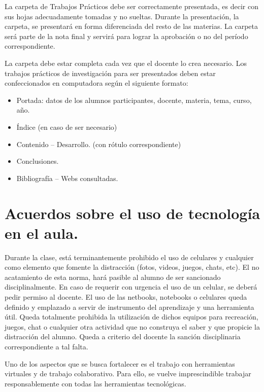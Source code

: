 \documentclass[../main]{subfiles}
\begin{document}
La carpeta de Trabajos Prácticos debe ser correctamente presentada, es decir con sus hojas adecuadamente tomadas y no sueltas. Durante la presentación, la carpeta, se presentará en forma diferenciada del resto de las materias. La carpeta será parte de la nota final y servirá para lograr la aprobación o no del período correspondiente. 

La carpeta debe estar completa cada vez que el docente lo crea necesario. Los trabajos prácticos de investigación para ser presentados deben estar confeccionados en computadora según el siguiente formato: 
\begin{itemize}
    
\item Portada: datos de los alumnos participantes, docente, materia, tema, curso, año. 

\item Índice (en caso de ser necesario) 

\item Contenido – Desarrollo. (con rótulo correspondiente) 

\item Conclusiones. 

\item Bibliografía – Webs consultadas. 

\end{itemize}
 

\section{Acuerdos sobre el uso de tecnología en el aula. } 

Durante la clase, está terminantemente prohibido el uso de celulares y cualquier como elemento que fomente la distracción (fotos, videos, juegos, chats, etc). El no acatamiento de esta norma, hará pasible al alumno de ser sancionado disciplinalmente. En caso de requerir con urgencia el uso de un celular, se deberá pedir permiso al docente. El uso de las netbooks, notebooks o celulares queda definido y emplazado a servir de instrumento del aprendizaje y una herramienta útil. Queda totalmente prohibida la utilización de dichos equipos para recreación, juegos, chat o cualquier otra actividad que no construya el saber y que propicie la distracción del alumno. Queda a criterio del docente la sanción disciplinaria correspondiente a tal falta. 

Uno de los aspectos que se busca fortalecer es el trabajo con herramientas virtuales y de trabajo colaborativo. Para ello, se vuelve imprescindible trabajar responsablemente con todas las herramientas tecnológicas. 
\end{document}
